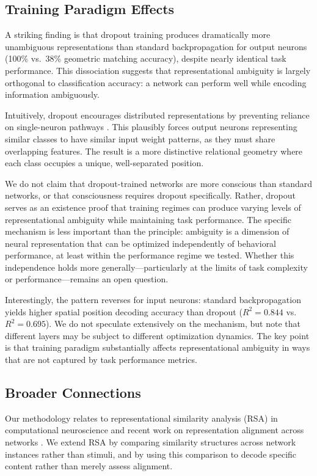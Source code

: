 \subsection{Training Paradigm Effects}

A striking finding is that dropout training produces dramatically more unambiguous representations than standard backpropagation for output neurons (100\% vs.\ 38\% geometric matching accuracy), despite nearly identical task performance. This dissociation suggests that representational ambiguity is largely orthogonal to classification accuracy: a network can perform well while encoding information ambiguously.

Intuitively, dropout encourages distributed representations by preventing reliance on single-neuron pathways \citep{baldi2013understanding}. This plausibly forces output neurons representing similar classes to have similar input weight patterns, as they must share overlapping features. The result is a more distinctive relational geometry where each class occupies a unique, well-separated position.

We do not claim that dropout-trained networks are more conscious than standard networks, or that consciousness requires dropout specifically. Rather, dropout serves as an existence proof that training regimes can produce varying levels of representational ambiguity while maintaining task performance. The specific mechanism is less important than the principle: ambiguity is a dimension of neural representation that can be optimized independently of behavioral performance, at least within the performance regime we tested. Whether this independence holds more generally—particularly at the limits of task complexity or performance—remains an open question.

Interestingly, the pattern reverses for input neurons: standard backpropagation yields higher spatial position decoding accuracy than dropout ($R^2 = 0.844$ vs.\ $R^2 = 0.695$). We do not speculate extensively on the mechanism, but note that different layers may be subject to different optimization dynamics. The key point is that training paradigm substantially affects representational ambiguity in ways that are not captured by task performance metrics.

\subsection{Broader Connections}

Our methodology relates to representational similarity analysis (RSA) in computational neuroscience \citep{kriegeskorte2008representational,yamins2016using} and recent work on representation alignment across networks \citep{huh2024platonic}. We extend RSA by comparing similarity structures across network instances rather than stimuli, and by using this comparison to decode specific content rather than merely assess alignment.

